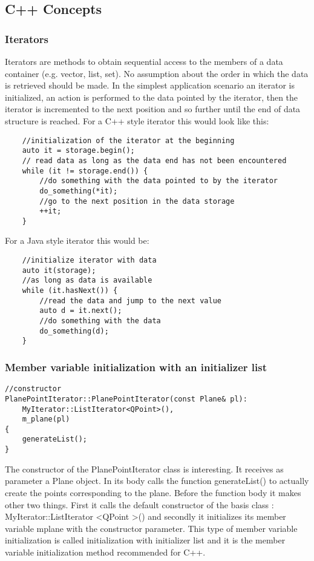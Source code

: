 \subsection {C++ Concepts}
\subsubsection {Iterators}

Iterators are methods to obtain sequential access to the members of a data container (e.g. vector, list, set). No assumption about the order in which the data is retrieved should be made. In the simplest application scenario an iterator is initialized, an action is performed to the data pointed by the iterator, then the iterator is incremented to the next position and so further until the end of data structure is reached. For a C++ style iterator this would look like this:

\begin{lstlisting}
	//initialization of the iterator at the beginning
	auto it = storage.begin();    
	// read data as long as the data end has not been encountered	
	while (it != storage.end()) {  
		//do something with the data pointed to by the iterator		
		do_something(*it);   
		//go to the next position in the data storage 
   		++it;   
	}
\end{lstlisting}

For a Java style iterator this would be:

\begin{lstlisting}
	//initialize iterator with data	
	auto it(storage);     
	//as long as data is available    
	while (it.hasNext()) { 
		//read the data and jump to the next value
		auto d = it.next();  
		//do something with the data
        do_something(d);  
    }
\end{lstlisting}
\subsubsection {Member variable initialization with an initializer list}

\begin{lstlisting}
//constructor
PlanePointIterator::PlanePointIterator(const Plane& pl):
    MyIterator::ListIterator<QPoint>(),
    m_plane(pl)
{
    generateList();
}
\end{lstlisting}

The constructor of the PlanePointIterator class is interesting. It receives as parameter a Plane object. In its body calls the function generateList() to actually create the points corresponding to the plane. Before the function body it makes other two things. First it calls the default constructor of the basis class : MyIterator::ListIterator \textless QPoint \textgreater() and secondly it initializes its member variable m\textunderscore plane with the constructor parameter. This type of member variable initialization is called initialization with initializer list and it is the member variable initialization method recommended for C++. 


